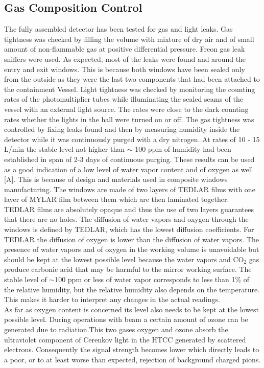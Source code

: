 \subsection{Gas Composition Control}
\indent The fully assembled detector has been tested for gas and light leaks. Gas tightness was checked by filling the volume with mixture of dry air and of small amount of non-flammable gas at positive differential pressure. Freon gas leak sniffers were used. As expected, most of the leaks were found and around the entry and exit windows. This is because both windows have been sealed only from the outside as they were the last two components that had been attached to the containment Vessel. Light tightness was checked by monitoring the counting rates of the photomultiplier tubes while illuminating the sealed seams of the vessel with an external light source. The rates were close to the dark counting rates whether the lights in the hall were turned on or off. The gas tightness was controlled by fixing leaks found and then by measuring humidity inside the detector while it was continuously purged with a dry nitrogen. At rates of 10 - 15 L/min the stable level not higher than $\sim$ 100 ppm of humidity had been established in span of 2-3 days of continuous purging. These results can be used as a good indication of a low level of water vapor content and of oxygen as well [A]. This is because of design and materials used in composite windows manufacturing. The windows are made of two layers of TEDLAR films with one layer of MYLAR film between them which are then laminated together. TEDLAR films are absolutely opaque and thus the use of two layers guarantees that there are no holes. The diffusion of water vapors and oxygen through the windows is defined by TEDLAR, which has the lowest diffusion coefficients. For TEDLAR the diffusion of oxygen is lower than the diffusion of water vapors. The presence of water vapors and of oxygen in the working volume is unavoidable but should be kept at the lowest possible level because the water vapors and CO${_2}$ gas produce carbonic acid that may be harmful to the mirror working surface. The stable level of $\sim$100 ppm or less of water vapor corresponds to less than 1\% of the relative humidity, but the relative humidity also depends on the temperature. This makes it harder to interpret any changes in the actual readings.
\\
\indent As far as oxygen content is concerned its level also needs to be kept at the lowest possible level. During operations with beam a certain amount of ozone can be generated due to radiation.This two gases oxygen and ozone absorb the ultraviolet component of Cerenkov light in the HTCC generated by scattered electrons. Consequently the signal strength becomes lower which directly leads to a poor, or to at least worse than expected, rejection of background charged pions.

